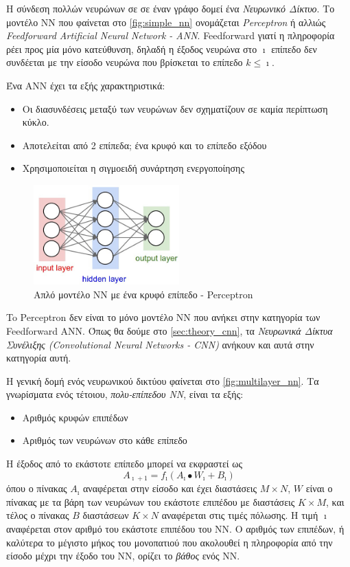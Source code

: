 Η σύνδεση πολλών νευρώνων σε σε έναν γράφο δομεί ένα \emph{Νευρωνικό Δίκτυο}.
Το μοντέλο ΝΝ που φαίνεται στο \autoref{fig:simple_nn}
ονομάζεται \emph{Perceptron} ή αλλιώς
\emph{Feedforward Artificial Neural Network - ANN}.
Feedforward γιατί η πληροφορία ρέει προς μία μόνο κατεύθυνση, δηλαδή
η έξοδος νευρώνα στο $\imath$ επίπεδο δεν συνδέεται με την είσοδο νευρώνα
που βρίσκεται το επίπεδο $k \leq \imath$.

Ένα ΑΝΝ έχει τα εξής χαρακτηριστικά:
\begin{itemize}
  \item{Οι διασυνδέσεις μεταξύ των νευρώνων δεν σχηματίζουν σε καμία περίπτωση κύκλο.}
  \item{Αποτελείται από 2 επίπεδα; ένα κρυφό και το επίπεδο εξόδου}
  \item{Χρησιμοποιείται η σιγμοειδή συνάρτηση ενεργοποίησης}
\end{itemize}

\begin{figure}[!ht]
  \centering
  \includegraphics[width=0.5\textwidth]{./images/chapter3/simple_nn.jpg}
  \caption[Απλό μοντέλο NN με ένα κρυφό επίπεδο - Perceptron]{Απλό μοντέλο NN με ένα κρυφό επίπεδο - Perceptron}
  \label{fig:simple_nn}
\end{figure}

To Perceptron δεν είναι το μόνο
μοντέλο ΝΝ που ανήκει στην κατηγορία των Feedforward ANN. Όπως θα δούμε στο
\autoref{sec:theory_cnn}, τα \emph{Νευρωνικά Δίκτυα Συνέλιξης
(Convolutional Neural Networks - CNN)} ανήκουν και αυτά στην κατηγορία αυτή.

Η γενική δομή ενός νευρωνικού δικτύου φαίνεται στο \autoref{fig:multilayer_nn}.
Τα γνωρίσματα ενός τέτοιου, \emph{πολυ-επίπεδου ΝΝ}, είναι τα εξής:
\begin{itemize}
  \item{Αριθμός κρυφών επιπέδων}
  \item{Αριθμός των νευρώνων στο κάθε επίπεδο}
\end{itemize}
Η έξοδος από το εκάστοτε επίπεδο μπορεί να εκφραστεί ως
\[
  A_{\imath+1} = f_{\imath}(A_{\imath} \bullet W_{\imath} + B_{\imath})
\]
όπου ο πίνακας $A_{\imath}$ αναφέρεται στην είσοδο και έχει διαστάσεις $M \times N$,
$W$ είναι ο πίνακας με τα βάρη των νευρώνων του εκάστοτε επιπέδου με διαστάσεις
$K \times M$, και τέλος ο πίνακας $B$ διαστάσεων $K \times N$ αναφέρεται στις
τιμές πόλωσης.
Η τιμή $\imath$ αναφέρεται στον αριθμό του εκάστοτε επιπέδου του ΝΝ.
Ο αριθμός των επιπέδων, ή καλύτερα το μέγιστο μήκος του μονοπατιού που ακολουθεί
η πληροφορία από την είσοδο μέχρι την έξοδο του ΝΝ, ορίζει το \emph{βάθος} ενός ΝΝ.

